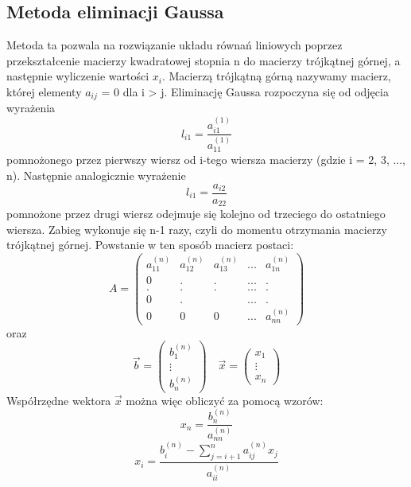 \documentclass{article}
\begin{document}
\subsection{Metoda eliminacji Gaussa}
Metoda ta pozwala na rozwiązanie układu równań liniowych poprzez przekształcenie macierzy kwadratowej stopnia n do macierzy trójkątnej górnej, a następnie wyliczenie wartości $x_i$. Macierzą trójkątną górną nazywamy macierz, której elementy $a_{ij}$ = 0 dla i > j. Eliminację Gaussa rozpoczyna się od odjęcia wyrażenia
\begin{equation}
    l_{i1} = \frac{a_{i1}^{(1)}}{a_{11}^{(1)}}
\end{equation}
pomnożonego przez pierwszy wiersz od i-tego wiersza macierzy (gdzie i = 2, 3, ..., n). Następnie analogicznie  wyrażenie 
\begin{equation}
    l_{i1} = \frac{a_{i2}}{a_{22}}
\end{equation}
pomnożone przez drugi wiersz odejmuje się kolejno od trzeciego do ostatniego wiersza. Zabieg wykonuje się n-1 razy, czyli do momentu otrzymania macierzy trójkątnej górnej.
Powstanie w ten sposób macierz postaci:
\[
A = \begin{pmatrix}
a_{11}^{(n)} & a_{12}^{(n)} & a_{13}^{(n)} & ... &  a_{1n}^{(n)}\\
0 & . & . & ...& .\\
. & . & . &... & .\\
0 & . &  & ... & .\\
0 & 0 & 0 & ... & a_{nn}^{(n)}
\end{pmatrix}
\]
oraz 
\[
\vec{b} = \begin{pmatrix} b_{1}^{(n)} \\ \vdots \\ b_{n}^{(n)} \end{pmatrix}
\quad
\vec{x} = \begin{pmatrix} x_{1} \\ \vdots \\ x_{n} \end{pmatrix}
\]
Współrzędne wektora $\vec{x}$ można więc obliczyć za pomocą wzorów:
\begin{equation}
    x_n = \frac{b_n^{(n)}}{a_{nn}^{(n)}}
\end{equation}
\begin{equation}
x_i = \frac{b_i^{(n)} - \sum_{j=i+1}^{n} a_{ij}^{(n)} x_j}{a_{ii}^{(n)}}
\end{equation}
\newpage
\end{document}

